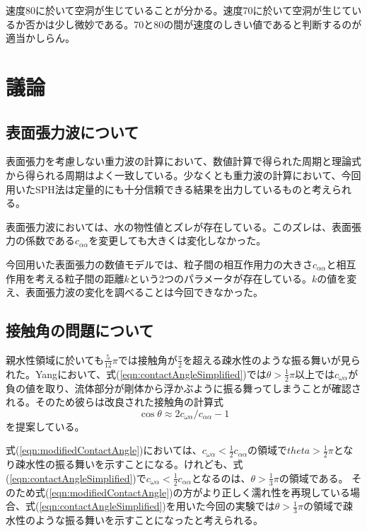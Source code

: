 \documentclass[]{jsarticle}
\begin{document}
速度80に於いて空洞が生じていることが分かる。速度70に於いて空洞が生じているか否かは少し微妙である。70と80の間が速度のしきい値であると判断するのが適当かしらん。
\newpage

\section{議論}
\subsection{表面張力波について}
\label{subsec:label}
表面張力を考慮しない重力波の計算において、数値計算で得られた周期と理論式から得られる周期はよく一致している。少なくとも重力波の計算において、今回用いたSPH法は定量的にも十分信頼できる結果を出力しているものと考えられる。

表面張力波においては、水の物性値とズレが存在している。このズレは、表面張力の係数である$c_{\alpha\alpha}$を変更しても大きくは変化しなかった。

今回用いた表面張力の数値モデルでは、粒子間の相互作用力の大きさ$c_{\alpha\alpha}$と相互作用を考える粒子間の距離$k$という2つのパラメータが存在している。$k$の値を変え、表面張力波の変化を調べることは今回できなかった。


\subsection{接触角の問題について}
\label{subsec:discContact}
親水性領域に於いても$\frac{5}{12}\pi$では接触角が$\frac{\pi}{2}$を超える疎水性のような振る舞いが見られた。Yang\cite{Yang2017}において、式(\ref{eqn:contactAngleSimplified})では$\theta>\frac{1}{2}\pi$以上では$c_{\omega\alpha}$が負の値を取り、流体部分が剛体から浮かぶように振る舞ってしまうことが確認される。そのため彼らは改良された接触角の計算式
\begin{equation}
  \label{eqn:modifiedContactAngle}
\cos \theta \approx 2c_{\omega\alpha}/c_{\alpha\alpha} -1
\end{equation}
を提案している。

式(\ref{eqn:modifiedContactAngle})においては、$c_{\omega\alpha}<\frac{1}{2}c_{\alpha\alpha}$の領域で$theta>\frac{1}{2}\pi$となり疎水性の振る舞いを示すことになる。けれども、式(\ref{eqn:contactAngleSimplified})で$c_{\omega\alpha}<\frac{1}{2}c_{\alpha\alpha}$となるのは、$\theta>\frac{1}{3}\pi$の領域である。
そのため式(\ref{eqn:modifiedContactAngle})の方がより正しく濡れ性を再現している場合、式(\ref{eqn:contactAngleSimplified})を用いた今回の実験では$\theta>\frac{1}{3}\pi$の領域で疎水性のような振る舞いを示すことになったと考えられる。
\end{document}
